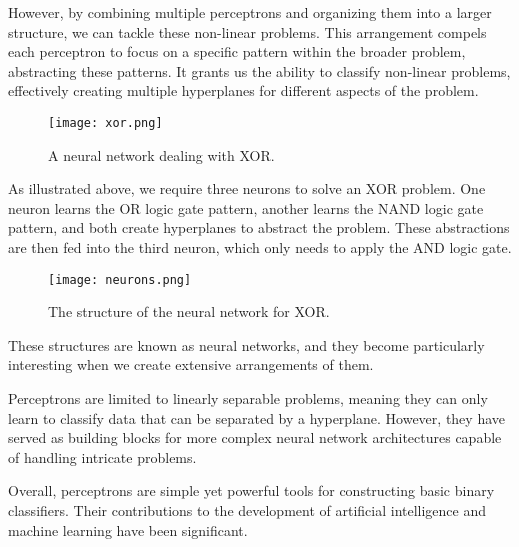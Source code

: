 However, by combining multiple perceptrons and organizing them into a larger structure, we can tackle these
non-linear problems. This arrangement compels each perceptron to focus on a specific pattern within the
broader problem, abstracting these patterns. It grants us the ability to classify non-linear problems,
effectively creating multiple hyperplanes for different aspects of the problem.

\begin{figure}[H]
  \centering
  \texttt{[image: xor.png]}
  \caption{A neural network dealing with XOR.}
\end{figure}

As illustrated above, we require three neurons to solve an XOR problem. One neuron learns the OR logic gate
pattern, another learns the NAND logic gate pattern, and both create hyperplanes to abstract the problem.
These abstractions are then fed into the third neuron, which only needs to apply the AND logic gate.

\begin{figure}[H]
  \centering
  \texttt{[image: neurons.png]}
  \caption{The structure of the neural network for XOR.}
\end{figure}

These structures are known as neural networks, and they become particularly interesting when we create
extensive arrangements of them.

Perceptrons are limited to linearly separable problems, meaning they can only learn to classify data that
can be separated by a hyperplane. However, they have served as building blocks for more complex neural
network architectures capable of handling intricate problems.

Overall, perceptrons are simple yet powerful tools for constructing basic binary classifiers. Their
contributions to the development of artificial intelligence and machine learning have been significant.

